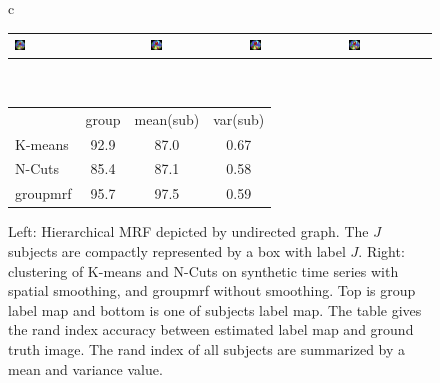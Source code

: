 \documentclass[runningheads,a4paper]{llncs}
\begin{document}
\begin{figure}[htb]
\begin{tabular}[b]{c}
\begin{tabular}[b]{lccccc}
      \includegraphics[width=0.12\textwidth]{figure1/true_sub1} &
      \includegraphics[width=0.12\textwidth]{figure1/kmeans_sub1} &
      \includegraphics[width=0.12\textwidth]{figure1/ncuts_sub1} &
      \includegraphics[width=0.12\textwidth]{figure1/mrf_sub1} \\
    \end{tabular} \\
    \hspace{15pt}
    \footnotesize
    \begin{tabular}[b]{l|ccc}
      & group & mean(sub) & var(sub) \\
      \textsf{K-means} & 92.9 & 87.0 & 0.67\\
      \textsf{N-Cuts} & 85.4 & 87.1 & 0.58 \\
      \textsf{groupmrf} & 95.7 & 97.5 & 0.59
    \end{tabular}
  \end{tabular}
  \caption{Left: Hierarchical MRF depicted by undirected graph. The $J$ subjects
    are compactly represented by a box with label $J$. Right: clustering of
    \textsf{K-means} and \textsf{N-Cuts} on synthetic time series with spatial
    smoothing, and \textsf{groupmrf} without smoothing. Top is group label map
    and bottom is one of subjects label map. The table gives the rand index accuracy
    between estimated label map and ground truth image. The rand index of all
    subjects are summarized by a mean and variance value.}
  \label{fig:fig1}
\vspace*{-8pt}
\end{figure}
\end{document}
